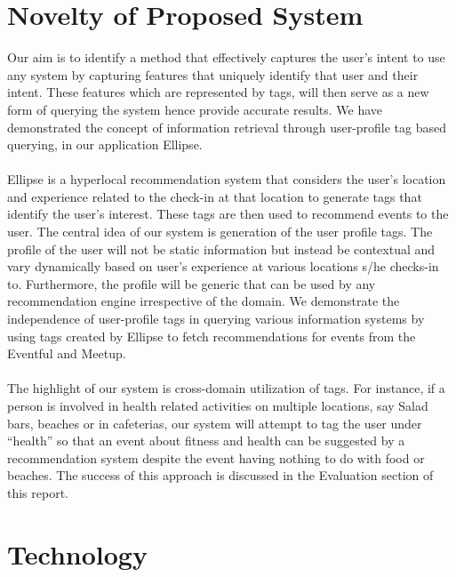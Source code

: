 \documentclass[12pt,letterpaper]{article}
\begin{document}
\section{Novelty of Proposed System}
Our aim is to identify a method that effectively captures the user’s intent to use any system by capturing features that uniquely identify that user and their intent. These features which are represented by tags, will then serve as a new form of querying the system hence provide accurate results. 
We have demonstrated the concept of information retrieval through user-profile tag based querying, in our application Ellipse.
\\\\
Ellipse is a hyperlocal recommendation system that considers the user’s location and experience related to the check-in at that location to generate tags that identify the user’s interest. These tags are then used to recommend events to the user. The central idea of our system is generation of the user profile tags. The profile of the user will not be static information but instead be contextual and vary dynamically based on user’s experience at various locations s/he checks-in to. Furthermore, the profile will be generic that can be used by any recommendation engine irrespective of the domain. We demonstrate the independence of user-profile tags in querying various information systems by using tags created by Ellipse to fetch recommendations for events from the Eventful and Meetup.
\\\\
The highlight of our system is cross-domain utilization of tags. For instance, if a person is involved in health related activities on multiple locations, say Salad bars, beaches or in cafeterias, our system will attempt to tag the user under \enquote{health} so that an event about fitness and health can be suggested by a recommendation system despite the event having nothing to do with food or beaches. The success of this approach is discussed in the Evaluation section of this report.

\section{Technology}
\end{document}
